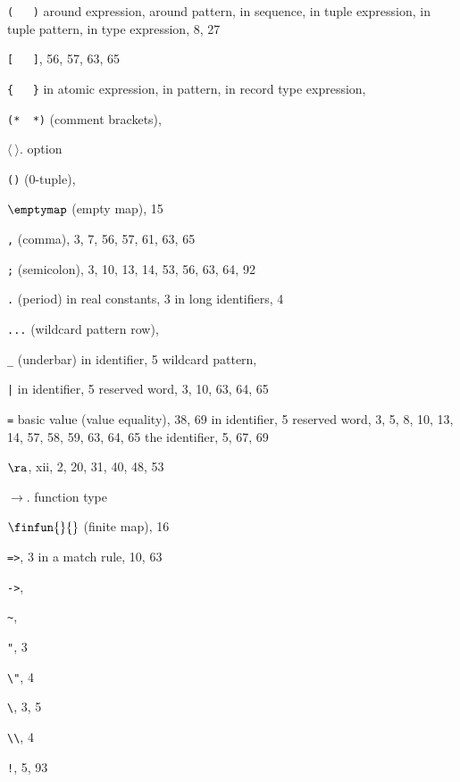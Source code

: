 \begin{theindex}
\item \verb+(   )+
\subitem around expression, \parexprefs
\subitem around pattern, \parpatrefs
\subitem in sequence,  \sequenceexprefs
\subitem in tuple expression, \tupleexprefs
\subitem in tuple pattern, \tuplepatrefs
\subitem in type expression, 8, 27
\item \verb+[   ]+, 56, 57, 63, 65
\item \verb+{   }+
\subitem in atomic expression, \recordexprefs
\subitem in pattern, \recordpatrefs
\subitem in record type expression, \bracestyexprefs
\item \verb+(*  *)+ (comment brackets), \commentrefs
\item $\langle\ \rangle$. \see option
\item \verb+()+ (0-tuple), \zerotuplerefs
\item $\emptymap$ (empty map), 15
\item \verb+,+ (comma), 3, 7, 56, 57, 61, 63, 65
\item \verb+;+ (semicolon), 3, 10, 13, 14, 53, 56, 63, 64, 92
\item \verb+.+ (period)
\subitem in real constants, 3
\subitem in long identifiers, 4
\item \verb+...+ (wildcard pattern row), \dotdotdotrefs
\item \verb+_+ (underbar)
\subitem in identifier, 5
\subitem wildcard pattern, \underscorewildrefs
\item \verb+|+
\subitem in identifier, 5
\subitem reserved word, 3, 10, 63, 64, 65
\item \verb+=+
\subitem basic value (value equality), 38, 69
\subitem in identifier, 5
\subitem reserved word, 3, 5, 8, 10, 13, 14, 57, 58, 59, 63, 64, 65
\subitem the identifier, 5, 67, 69
\item $\ra$, xii, 2, 20, 31, 40, 48, 53
\item $\rightarrow$. \see function type
\item $\finfun{}{}$ (finite map), 16
\item \verb+=>+, 3
\subitem in a match rule, 10, 63
\item \verb+->+, \funtyperefs
\item \verb+~+, \unaryminusrefs
\item \verb+"+, 3
\item \verb+\"+, 4
\item \verb+\+, 3, 5
\item \verb+\\+, 4
\item \verb+!+, 5, 93

\end{theindex}
